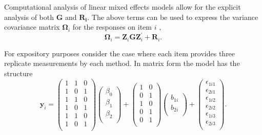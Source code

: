 \documentclass[12pt, a4paper]{report}
\theoremstyle{plain}
\theoremstyle{definition}
\theoremstyle{remark}
\begin{document}
	
 Computational analysis of linear mixed effects models allow for the explicit analysis of both $\boldsymbol{G}$ and $\boldsymbol{R_i}$.
	The above terms can be used to express the  variance covariance matrix $\boldsymbol{\Omega}_i$ for the responses on item $i$ ,
	\[
	\boldsymbol{\Omega}_i = \boldsymbol{Z}_i \boldsymbol{G} \boldsymbol{Z}_i^{\prime} + \boldsymbol{R}_i.
	\]



For expository purposes consider the case where each item provides three replicate measurements by each method. In matrix form the model has the structure
\[
\boldsymbol{y}_{i} =
\left(\begin{array}{ccc}
1 & 1 & 0 \\ 1 & 0 & 1 \\ 1 & 1 & 0 \\
1 & 0 & 1 \\ 1 & 1 & 0 \\ 1 & 0 & 1 \\
\end{array}\right)
\left(\begin{array}{c}
\beta_0 \\ \beta_1 \\ \beta_2 \\
\end{array}\right)
+
\left(\begin{array}{cc}
1 & 0 \\0 & 1 \\1 & 0 \\0 & 1 \\0 & 1 \\\end{array}
\right)
\left(\begin{array}{c}
b_{1i} \\   b_{2i} \\
\end{array}\right)
+
\left( \begin{array}{c}
\epsilon_{1i1} \\\epsilon_{2i1} \\\epsilon_{1i2} \\ \epsilon_{2i2} \\\epsilon_{1i3} \\\epsilon_{2i3} \\
\end{array}\right).
\]
\end{document}

